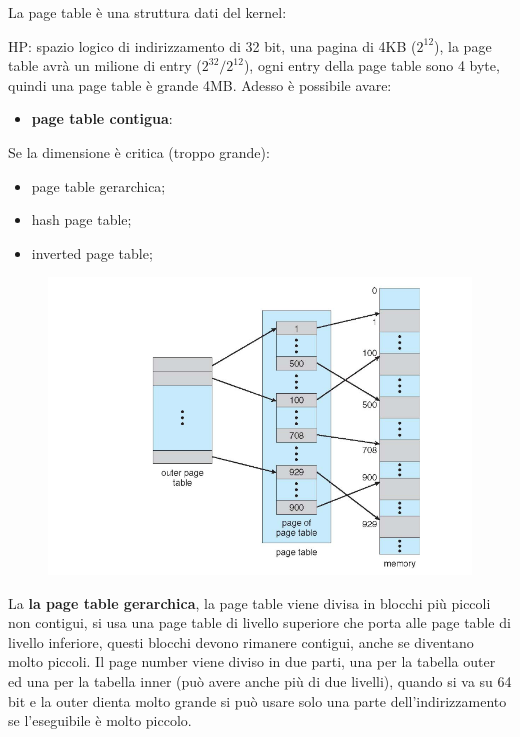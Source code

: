 \documentclass[12pt]{article}
\begin{document}
La page table \`e una struttura dati del kernel:
\begin{example}{}{}
  HP: spazio logico di indirizzamento di 32 bit, una pagina di 4KB ($2^{12}$), la page table avr\`a un milione di entry ($2^{32}/2^{12}$), ogni entry della page table sono 4 byte, quindi una page table \`e grande 4MB. Adesso \`e possibile avare:
  \begin{itemize}
    \item \textbf{page table contigua}:
  \end{itemize}
  Se la dimensione \`e critica (troppo grande):
    \begin{itemize}
      \item page table gerarchica;
      \item hash page table;
      \item inverted page table;
    \end{itemize}
\end{example}

\begin{figure}
  \centering
  \includegraphics[width=.9\linewidth]{page-table-gerarchica.png}
\end{figure}
La \textbf{la page table gerarchica}, la page table viene divisa in blocchi pi\`u piccoli non contigui, si usa una page table di livello superiore che porta alle page table di livello inferiore, questi blocchi devono rimanere contigui, anche se diventano molto piccoli. Il page number viene diviso in due parti, una per la tabella outer ed una per la tabella inner (pu\`o avere anche pi\`u di due livelli), quando si va su 64 bit e la outer dienta molto grande si pu\`o usare solo una parte dell'indirizzamento se l'eseguibile \`e molto piccolo.
\end{document}
